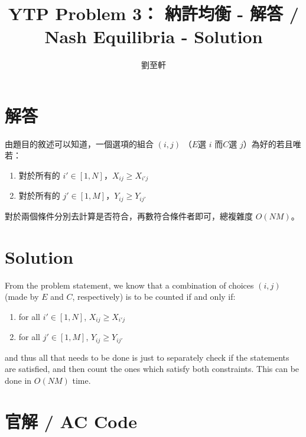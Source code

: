 \documentclass[12pt,a4paper]{article}
\title{YTP Problem 3： 納許均衡 - 解答 / Nash Equilibria - Solution}
\author{劉至軒}
\theoremstyle{mystyle}	%
\begin{document}
	\maketitle
	\section*{解答}
		由題目的敘述可以知道，一個選項的組合 $(i, j)$ （$E$選 $i$ 而$C$選 $j$）為好的若且唯若：
		\begin{enumerate}
			\item 對於所有的 $i' \in [1, N]$，$X_{ij} \ge X_{i'j}$
			\item 對於所有的 $j' \in [1, M]$，$Y_{ij} \ge Y_{ij'}$
		\end{enumerate}
		對於兩個條件分別去計算是否符合，再數符合條件者即可，總複雜度 $O(NM)$。
	\section*{Solution}
		From the problem statement, we know that a combination of choices $(i, j)$ (made by $E$ and $C$, respectively) is to be counted if and only if:
		\begin{enumerate}
			\item for all $i' \in [1, N]$, $X_{ij} \ge X_{i'j}$
			\item for all $j' \in [1, M]$, $Y_{ij} \ge Y_{ij'}$
		\end{enumerate}
		and thus all that needs to be done is just to separately check if the statements are satisfied, and then count the ones which satisfy both constraints. This can be done in $O(NM)$ time. 
		
	\newpage
	\section*{官解 / AC Code}
	\inputminted[linenos,tabsize=4,breaklines,bgcolor=bg]{c++}{./p3_sol.cpp}
		
	
\end{document}
